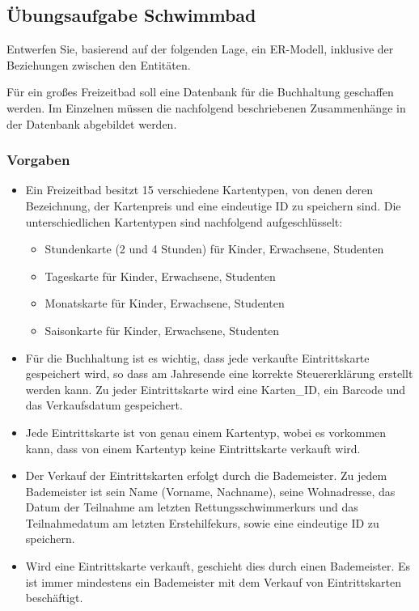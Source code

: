\subsection{Übungsaufgabe Schwimmbad}
Entwerfen Sie, basierend auf der folgenden Lage, ein ER-Modell, inklusive der Beziehungen zwischen den Entitäten.

Für ein groß{}es Freizeitbad soll eine Datenbank für die Buchhaltung geschaffen werden. Im Einzelnen müssen die nachfolgend beschriebenen Zusammenhänge in der Datenbank abgebildet werden.

\subsubsection{Vorgaben}
\begin{itemize}
    \item Ein Freizeitbad besitzt 15 verschiedene Kartentypen, von denen deren Bezeichnung, der
          Kartenpreis und eine eindeutige ID zu speichern sind. Die unterschiedlichen Kartentypen sind nachfolgend aufgeschlüsselt:
          \begin{itemize}
              \item Stundenkarte (2 und 4 Stunden) für Kinder, Erwachsene, Studenten
              \item Tageskarte für Kinder, Erwachsene, Studenten
              \item Monatskarte für Kinder, Erwachsene, Studenten
              \item Saisonkarte für Kinder, Erwachsene, Studenten
          \end{itemize}
    \item Für die Buchhaltung ist es wichtig, dass jede verkaufte Eintrittskarte gespeichert wird, so
          dass am Jahresende eine korrekte Steuererklärung erstellt werden kann. Zu jeder Eintrittskarte wird
          eine Karten\_ID, ein Barcode und das Verkaufsdatum gespeichert.
    \item Jede Eintrittskarte ist von genau einem Kartentyp, wobei es vorkommen kann, dass von einem Kartentyp keine Eintrittskarte verkauft wird.
    \item Der Verkauf der Eintrittskarten erfolgt durch die Bademeister. Zu jedem Bademeister ist
          sein Name (Vorname, Nachname), seine Wohnadresse, das Datum der Teilnahme am letzten Rettungsschwimmerkurs und das Teilnahmedatum am letzten Erstehilfekurs, sowie eine eindeutige ID zu speichern.
    \item Wird eine Eintrittskarte verkauft, geschieht dies durch einen Bademeister. Es ist immer mindestens ein Bademeister mit dem Verkauf von Eintrittskarten beschäftigt.

\end{itemize}
